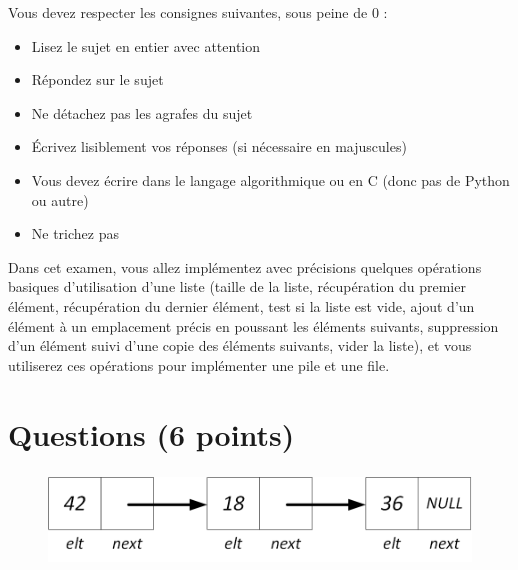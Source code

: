 \documentclass[11pt,a4paper]{article}
\begin{document}
\MakeExamTitle                   %


\bigskip

Vous devez respecter les consignes suivantes, sous peine de 0 :

\begin{itemize}
\item Lisez le sujet en entier avec attention
\item Répondez sur le sujet
\item Ne détachez pas les agrafes du sujet
\item \'Ecrivez lisiblement vos réponses (si nécessaire en majuscules)
\item Vous devez écrire dans le langage algorithmique ou en C (donc pas de Python ou autre)
\item Ne trichez pas
\end{itemize}

\bigskip

\vfillFirst

Dans cet examen, vous allez implémentez avec précisions quelques opérations basiques d'utilisation d'une liste (taille de la liste, récupération du premier élément, récupération du dernier élément, test si la liste est vide, ajout d'un élément à un emplacement précis en poussant les éléments suivants, suppression d'un élément suivi d'une copie des éléments suivants, vider la liste), et vous utiliserez ces opérations pour implémenter une pile et une file.

\hspace{2cm}

\section{Questions (6 points)}

\bigskip

\begin{figure}[ht!]
\centering
\centerline{  %
\includegraphics[height=2.5cm]{img/Liste_p_1.png}
}
\end{figure}
\end{document}
